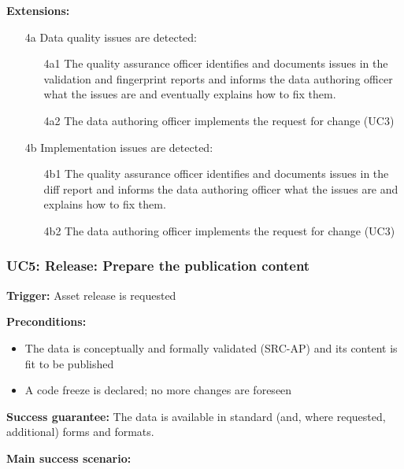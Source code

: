 	\textbf{Extensions:}
	
	\begin{enumerate}
		\item [4a] Data quality issues are detected:
		\begin{enumerate}
			\item [4a1] The quality assurance officer identifies  and documents issues in the validation and fingerprint reports and informs the data authoring officer what the issues are and eventually explains how to fix them.
			\item [4a2] The data authoring officer implements the request for change (UC3)			
		\end{enumerate}
		\item [4b] Implementation issues are detected:
		\begin{enumerate}
			\item [4b1] The quality assurance officer identifies and documents issues in the diff report and informs the data authoring officer what the issues are and explains how to fix them.
			\item [4b2] The data authoring officer implements the request for change (UC3)			
		\end{enumerate}
	\end{enumerate}


	\subsubsection{UC5: Release: Prepare the publication content}
	\label{sec:uc5}
	\textbf{Trigger:} Asset release is requested
	
	\textbf{Preconditions:} 
	\begin{itemize}
		\item The data is conceptually and formally validated (SRC-AP) and its content is fit to be published
		\item A code freeze is declared; no more changes are foreseen
	\end{itemize}
	
	\textbf{Success guarantee:} The data is available in standard (and, where requested, additional) forms and formats.
	
	\textbf{Main success scenario:}
	
